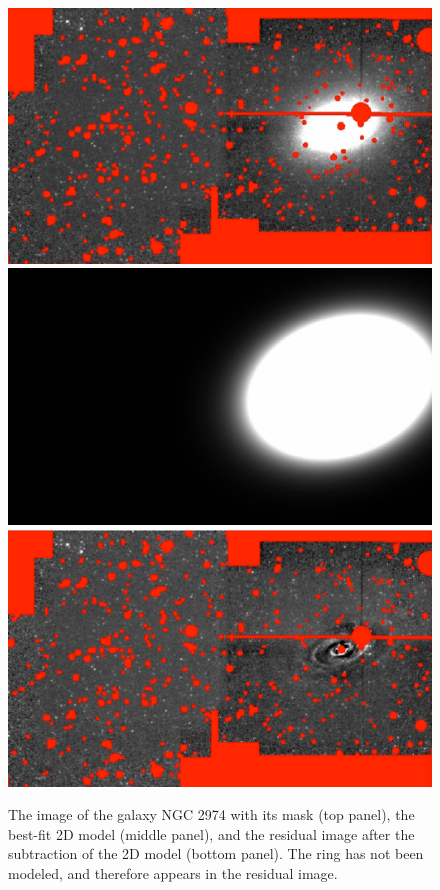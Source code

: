 \documentclass[preprint2]{emulateapj}
\begin{document}
\begin{figure}[h]
\begin{center}
\includegraphics[width=\columnwidth]{images/n2974_imgmsk.pdf}
\includegraphics[width=\columnwidth]{images/n2974_model.pdf}
\includegraphics[width=\columnwidth]{images/n2974_resid.pdf}
\caption{The image of the galaxy NGC 2974 with its mask (top panel), the best-fit 2D model (middle panel), 
and the residual image after the subtraction of the 2D model (bottom panel).
The ring has not been modeled, and therefore appears in the residual image.}
\label{fig:n29742d}
\end{center}
\end{figure}
\end{document}
